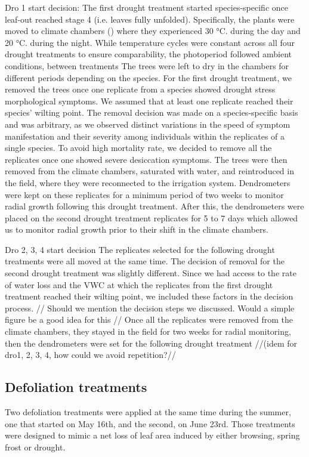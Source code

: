\documentclass{article}
\begin{document}
	Dro 1 start decision:
	The first drought treatment started species-specific once leaf-out reached stage 4 (i.e. leaves fully unfolded). Specifically, the plants were moved to climate chambers () where they experienced 30 °C. during the day and 20 °C. during the night. While temperature cycles were constant across all four drought treatments to ensure comparability, the photoperiod followed ambient conditions, between treatments The trees were left to dry in the chambers for different periods depending on the species. For the first drought treatment, we removed the trees once one replicate from a species showed drought stress morphological symptoms. We assumed that at least one replicate reached their species’ wilting point. The removal decision was made on a species-specific basis and was arbitrary, as we observed distinct variations in the speed of symptom manifestation and their severity among individuals within the replicates of a single species. To avoid high mortality rate, we decided to remove all the replicates once one showed severe desiccation symptoms. The trees were then removed from the climate chambers, saturated with water, and reintroduced in the field, where they were reconnected to the irrigation system. Dendrometers were kept on these replicates for a minimum period of two weeks to monitor radial growth following this drought treatment. After this, the dendrometers were placed on the second drought treatment replicates for 5 to 7 days which allowed us to monitor radial growth prior to their shift in the climate chambers.
	
	Dro 2, 3, 4 start decision
	The replicates selected for the following drought treatments were all moved at the same time. The decision of removal for the second drought treatment was slightly different. Since we had access to the rate of water loss and the VWC at which the replicates from the first drought treatment reached their wilting point, we included these factors in the decision process. // Should we mention the decision steps we discussed. Would a simple figure be a good idea for this // Once all the replicates were removed from the climate chambers, they stayed in the field for two weeks for radial monitoring, then the dendrometers were set for the following drought treatment //(idem for dro1, 2, 3, 4, how could we avoid repetition?//
	
	
	\subsection*{Defoliation treatments}
	Two defoliation treatments were applied at the same time during the summer, one that started on May 16th, and the second, on June 23rd. Those treatments were designed to mimic a net loss of leaf area induced by either browsing, spring frost or drought. 
	
\end{document}
